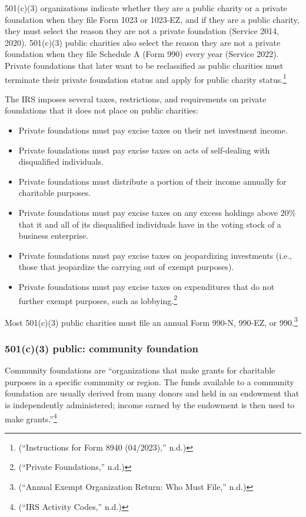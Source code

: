 \documentclass[
  letterpaper,
  DIV=11,
  numbers=noendperiod,
  oneside]{scrreprt}
\begin{document}
501(c)(3) organizations indicate whether they are a public charity or a
private foundation when they file Form 1023 or 1023-EZ, and if they are
a public charity, they must select the reason they are not a private
foundation (Service 2014, 2020). 501(c)(3) public charities also select
the reason they are not a private foundation when they file Schedule A
(Form 990) every year (Service 2022). Private foundations that later
want to be reclassified as public charities must terminate their private
foundation status and apply for public charity status.\footnote{({``Instructions
  for Form 8940 (04/2023),''} n.d.)}

The IRS imposes several taxes, restrictions, and requirements on private
foundations that it does not place on public charities:

\begin{itemize}
\item
  Private foundations must pay excise taxes on their net investment
  income.
\item
  Private foundations must pay excise taxes on acts of self-dealing with
  disqualified individuals.
\item
  Private foundations must distribute a portion of their income annually
  for charitable purposes.
\item
  Private foundations must pay excise taxes on any excess holdings above
  20\% that it and all of its disqualified individuals have in the
  voting stock of a business enterprise.
\item
  Private foundations must pay excise taxes on jeopardizing investments
  (i.e., those that jeopardize the carrying out of exempt purposes).
\item
  Private foundations must pay excise taxes on expenditures that do not
  further exempt purposes, such as lobbying.\footnote{({``Private
    Foundations,''} n.d.)}
\end{itemize}

Most 501(c)(3) public charities must file an annual Form 990-N, 990-EZ,
or 990.\footnote{({``Annual Exempt Organization Return: Who Must
  File,''} n.d.)}

\hypertarget{c3-public-community-foundation}{%
\subsubsection{501(c)(3) public: community
foundation}\label{c3-public-community-foundation}}

Community foundations are ``organizations that make grants for
charitable purposes in a specific community or region. The funds
available to a community foundation are usually derived from many donors
and held in an endowment that is independently administered; income
earned by the endowment is then used to make grants.''\footnote{({``IRS
  Activity Codes,''} n.d.)}
\end{document}
